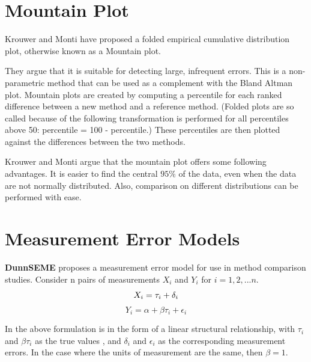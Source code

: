 \documentclass[12pt, a4paper]{report}
\theoremstyle{plain}
\theoremstyle{definition}
\theoremstyle{remark}
\begin{document}
	
	
	
	
	
	
	
	\section{Mountain Plot} Krouwer and Monti have proposed a folded empirical cumulative distribution plot, otherwise known as a Mountain plot.
	
	They argue that it is suitable for detecting large, infrequent errors. This is a non-parametric method that can be used as a complement with the Bland Altman plot.  Mountain plots are created by computing a percentile
	for each ranked difference between a new method and a reference method. (Folded plots are so called because of the following transformation is performed for all percentiles above 50: percentile = 100 - percentile.) These percentiles are then plotted against the differences between the two methods.
	
	Krouwer and Monti argue that the mountain plot offers some following advantages. It is easier to find the central $95\%$ of the data, even when the data are not normally distributed. Also, comparison on different distributions can be performed with ease.
	
	
	


	\section{Measurement Error Models}
	\textbf{DunnSEME} proposes a measurement error model for use in
	method comparison studies. Consider n pairs of measurements
	$X_{i}$ and $Y_{i}$ for $i=1,2,...n$.
	\begin{equation}
		X_{i} = \tau_{i}+\delta_{i}\\
	\end{equation}
	\begin{equation}
		Y_{i} = \alpha +\beta\tau_{i}+\epsilon_{i} \nonumber
	\end{equation}
	
	In the above formulation is in the form of a linear structural
	relationship, with $\tau_{i}$ and $\beta\tau_{i}$ as the true
	values , and $\delta_{i}$ and $\epsilon_{i}$ as the corresponding
	measurement errors. In the case where the units of measurement are
	the same, then $\beta =1$.
	
\end{document}

